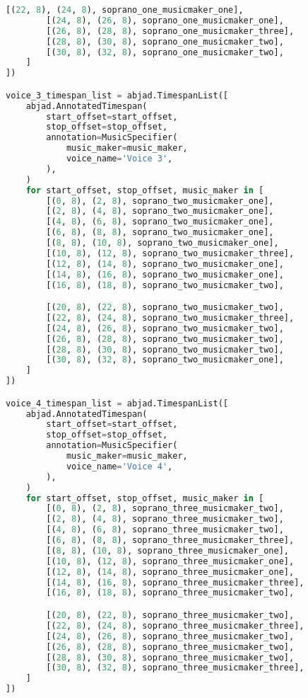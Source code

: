 \begin{lstlisting}[language=Python, caption=Invocation Source Code]
        [(22, 8), (24, 8), soprano_one_musicmaker_one],
        [(24, 8), (26, 8), soprano_one_musicmaker_one],
        [(26, 8), (28, 8), soprano_one_musicmaker_three],
        [(28, 8), (30, 8), soprano_one_musicmaker_two],
        [(30, 8), (32, 8), soprano_one_musicmaker_two],
    ]
])

voice_3_timespan_list = abjad.TimespanList([
    abjad.AnnotatedTimespan(
        start_offset=start_offset,
        stop_offset=stop_offset,
        annotation=MusicSpecifier(
            music_maker=music_maker,
            voice_name='Voice 3',
        ),
    )
    for start_offset, stop_offset, music_maker in [
        [(0, 8), (2, 8), soprano_two_musicmaker_one],
        [(2, 8), (4, 8), soprano_two_musicmaker_one],
        [(4, 8), (6, 8), soprano_two_musicmaker_one],
        [(6, 8), (8, 8), soprano_two_musicmaker_one],
        [(8, 8), (10, 8), soprano_two_musicmaker_one],
        [(10, 8), (12, 8), soprano_two_musicmaker_three],
        [(12, 8), (14, 8), soprano_two_musicmaker_one],
        [(14, 8), (16, 8), soprano_two_musicmaker_one],
        [(16, 8), (18, 8), soprano_two_musicmaker_two],

        [(20, 8), (22, 8), soprano_two_musicmaker_two],
        [(22, 8), (24, 8), soprano_two_musicmaker_three],
        [(24, 8), (26, 8), soprano_two_musicmaker_two],
        [(26, 8), (28, 8), soprano_two_musicmaker_two],
        [(28, 8), (30, 8), soprano_two_musicmaker_two],
        [(30, 8), (32, 8), soprano_two_musicmaker_one],
    ]
])

voice_4_timespan_list = abjad.TimespanList([
    abjad.AnnotatedTimespan(
        start_offset=start_offset,
        stop_offset=stop_offset,
        annotation=MusicSpecifier(
            music_maker=music_maker,
            voice_name='Voice 4',
        ),
    )
    for start_offset, stop_offset, music_maker in [
        [(0, 8), (2, 8), soprano_three_musicmaker_two],
        [(2, 8), (4, 8), soprano_three_musicmaker_two],
        [(4, 8), (6, 8), soprano_three_musicmaker_two],
        [(6, 8), (8, 8), soprano_three_musicmaker_three],
        [(8, 8), (10, 8), soprano_three_musicmaker_one],
        [(10, 8), (12, 8), soprano_three_musicmaker_one],
        [(12, 8), (14, 8), soprano_three_musicmaker_one],
        [(14, 8), (16, 8), soprano_three_musicmaker_three],
        [(16, 8), (18, 8), soprano_three_musicmaker_two],

        [(20, 8), (22, 8), soprano_three_musicmaker_two],
        [(22, 8), (24, 8), soprano_three_musicmaker_three],
        [(24, 8), (26, 8), soprano_three_musicmaker_two],
        [(26, 8), (28, 8), soprano_three_musicmaker_two],
        [(28, 8), (30, 8), soprano_three_musicmaker_two],
        [(30, 8), (32, 8), soprano_three_musicmaker_three],
    ]
])


\end{lstlisting}
